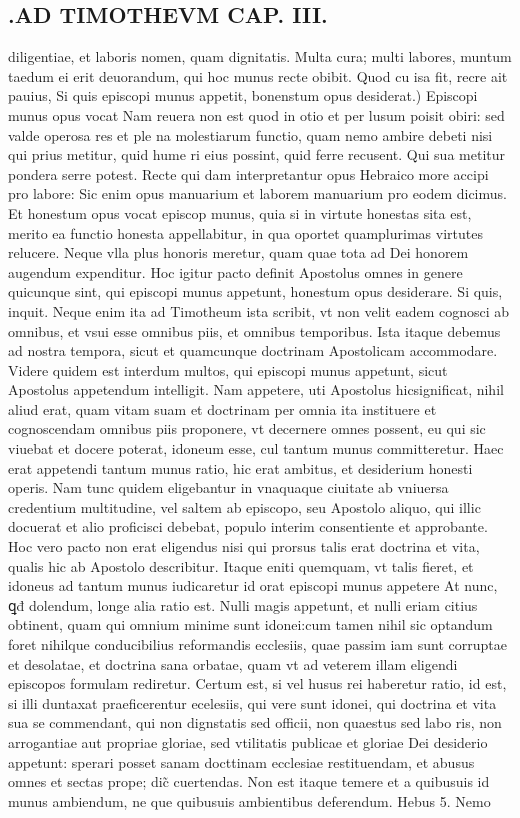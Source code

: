 \documentclass{article}
\begin{document}
\begin{pages}
\section*{.AD TIMOTHEVM CAP. III. }
\marginpar{[ p.75 ]}\pstart diligentiae, et laboris nomen, quam dignitatis. Multa cura; multi labores, muntum taedum ei erit deuorandum, qui hoc munus recte obibit. Quod cu isa fit, recre ait pauius, Si quis episcopi munus appetit, bonenstum opus desiderat.) Episcopi munus opus vocat  \pend\pstart Nam reuera non est quod in otio et per lusum poisit obiri: sed valde operosa res et ple na molestiarum functio, quam nemo ambire debeti nisi qui prius metitur, quid hume ri eius possint, quid ferre recusent. Qui sua metitur pondera serre potest. Recte qui dam interpretantur opus Hebraico more accipi pro labore: Sic enim opus manuarium et laborem manuarium pro eodem dicimus. Et honestum opus vocat episcop munus, quia si in virtute honestas sita est, merito ea functio honesta appellabitur, in qua oportet quamplurimas virtutes relucere. Neque vlla plus honoris meretur, quam quae tota ad Dei honorem augendum expenditur. Hoc igitur pacto definit Apostolus omnes in genere quicunque sint, qui episcopi munus appetunt, honestum opus desiderare. Si quis, inquit. Neque enim ita ad Timotheum ista scribit, vt non velit eadem cognosci ab omnibus, et vsui esse omnibus piis, et omnibus temporibus. Ista itaque debemus ad nostra tempora, sicut et quamcunque doctrinam Apostolicam accommodare. Videre quidem est interdum multos, qui episcopi munus appetunt, sicut Apostolus appetendum intelligit. Nam appetere, uti Apostolus hicsignificat, nihil aliud erat, quam vitam suam et doctrinam per omnia ita instituere et cognoscendam omnibus piis proponere, vt decernere omnes possent, eu qui sic viuebat et docere poterat, idoneum esse, cul tantum munus committeretur. Haec erat appetendi tantum munus ratio, hic erat ambitus, et desiderium honesti operis. Nam tunc quidem eligebantur in vnaquaque ciuitate ab vniuersa credentium multitudine, vel saltem ab episcopo, seu Apostolo aliquo, qui illic docuerat et alio proficisci debebat, populo interim consentiente et approbante. Hoc vero pacto non erat eligendus nisi qui prorsus talis erat doctrina et vita, qualis hic ab Apostolo describitur. Itaque eniti quemquam, vt talis fieret, et idoneus ad tantum munus iudicaretur id orat episcopi munus appetere At nunc, ꝗđ dolendum, longe alia ratio est. Nulli magis appetunt, et nulli eriam citius obtinent, quam qui omnium minime sunt idonei:cum tamen nihil sic optandum foret nihilque conducibilius reformandis ecclesiis, quae passim iam sunt corruptae et desolatae, et doctrina sana orbatae, quam vt ad veterem illam eligendi episcopos formulam rediretur. Certum est, si vel husus rei haberetur ratio, id est, si illi duntaxat praeficerentur ecelesiis, qui vere sunt idonei, qui doctrina et vita sua se commendant, qui non dignstatis sed officii, non quaestus sed labo ris, non arrogantiae aut propriae gloriae, sed vtilitatis publicae et gloriae Dei desiderio appetunt: sperari posset sanam docttinam ecclesiae restituendam, et abusus omnes et sectas prope; dic̃ cuertendas. Non est itaque temere et a quibusuis id munus ambiendum, ne que quibusuis ambientibus deferendum. Hebus 5. Nemo 
\end{pages}
\end{document}
